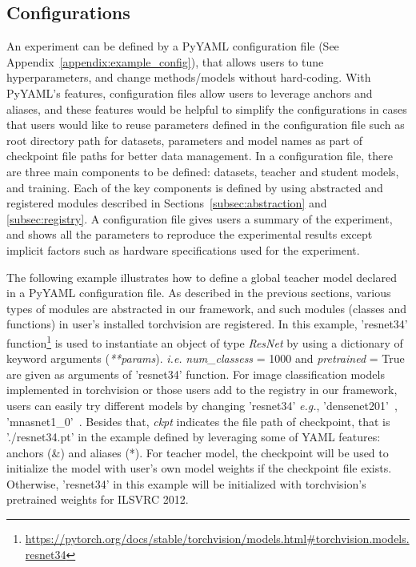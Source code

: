 \documentclass[runningheads]{llncs}
\begin{document}
\subsection{Configurations}
\label{subsec:configs}
An experiment can be defined by a PyYAML configuration file (See Appendix~\ref{appendix:example_config}), that allows users to tune hyperparameters, and change methods/models without hard-coding.
With PyYAML's features, configuration files allow users to leverage anchors and aliases, and these features would be helpful to simplify the configurations in cases that users would like to reuse parameters defined in the configuration file such as root directory path for datasets, parameters and model names as part of checkpoint file paths for better data management.
In a configuration file, there are three main components to be defined: datasets, teacher and student models, and training.
Each of the key components is defined by using abstracted and registered modules described in Sections~\ref{subsec:abstraction} and \ref{subsec:registry}.
A configuration file gives users a summary of the experiment, and shows all the parameters to reproduce the experimental results except implicit factors such as hardware specifications used for the experiment.

The following example illustrates how to define a global teacher model declared in a PyYAML configuration file.
As described in the previous sections, various types of modules are abstracted in our framework, and such modules (classes and functions) in user's installed torchvision are registered.
In this example, 'resnet34' function\footnote{\url{https://pytorch.org/docs/stable/torchvision/models.html\#torchvision.models.resnet34}} is used to instantiate an object of type \emph{ResNet} by using a dictionary of keyword arguments (\emph{**params}). \emph{i.e.} \emph{num\_classess} = 1000 and \emph{pretrained} = True are given as arguments of 'resnet34' function.
For image classification models implemented in torchvision or those users add to the registry in our framework, users can easily try different models by changing 'resnet34' \emph{e.g.}, 'densenet201'~\cite{huang2017densely}, 'mnasnet1\_0'~\cite{tan2019mnasnet}.
Besides that, \emph{ckpt} indicates the file path of checkpoint, that is './resnet34.pt' in the example defined by leveraging some of YAML features: anchors (\&) and aliases (*).
For teacher model, the checkpoint will be used to initialize the model with user's own model weights if the checkpoint file exists.
Otherwise, 'resnet34' in this example will be initialized with torchvision's pretrained weights for ILSVRC 2012.
\end{document}
